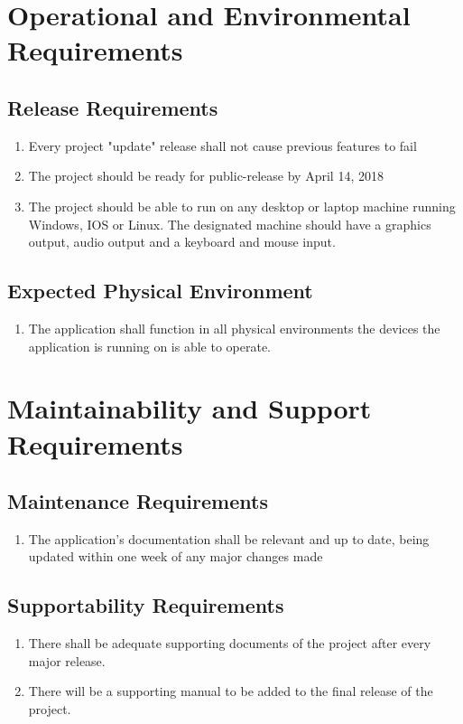 \documentclass{article}
\begin{document}
\section{Operational and Environmental Requirements}
\subsection{Release Requirements}
\begin{enumerate}[{RR}1. ]
	\item Every project "update" release shall not cause previous features to fail
	\item The project should be ready for public-release by April  14, 2018
	\item The project should be able to run on any desktop or laptop machine running Windows, IOS or Linux. The designated machine should have a graphics output, audio output and a keyboard and mouse input.
\end{enumerate}
\subsection{Expected Physical Environment}
\begin{enumerate}[{EPE}1. ]
	\item The application shall function in all physical environments the devices the application is running on is able to operate.
\end{enumerate}
\section{Maintainability and Support Requirements}
\subsection{Maintenance Requirements}
\begin{enumerate}[{MR}1. ]
	\item The application's documentation shall be relevant and up to date, being updated within one week of any major changes made
\end{enumerate}
\subsection{Supportability Requirements}
\begin{enumerate}[{SUPR}1. ]
	\item There shall be adequate supporting documents of the project after every major release.
	\item There will be a supporting manual to be added to the final release of the project.
\end{enumerate}
\end{document}

